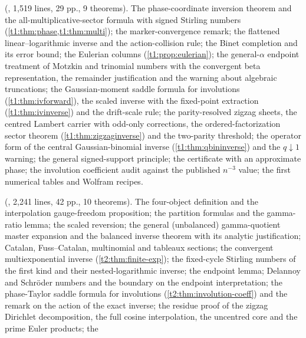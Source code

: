 \documentclass[11pt,openany]{book}
\numberwithin{equation}{chapter}
\theoremstyle{plain}
\theoremstyle{definition}
\theoremstyle{remark}
\begin{document}
\begin{description}[leftmargin=1.5em,style=nextline]
\item[Source 1 (labels \texttt{t1:}): \emph{Combinatorial Transseries and
Their Inverses: Further Families}] (,
1{,}519 lines, 29 pp., 9 theorems).  The phase-coordinate inversion theorem
and the all-multiplicative-sector formula with signed Stirling numbers
(\cref{t1:thm:phase,t1:thm:multi}); the marker-convergence remark; the
flattened linear--logarithmic inverse and the action-collision rule; the
Binet completion and its error bound; the Eulerian columns
(\cref{t1:prop:eulerian}); the general-$\alpha$ endpoint treatment of
Motzkin and trinomial numbers with the convergent beta representation, the
remainder justification and the warning about algebraic truncations; the
Gaussian-moment saddle formula for involutions (\cref{t1:thm:ivforward}),
the scaled inverse with the fixed-point extraction
(\cref{t1:thm:ivinverse}) and the drift-scale rule; the parity-resolved
zigzag sheets, the centred Lambert carrier with odd-only corrections, the
ordered-factorization sector theorem (\cref{t1:thm:zigzaginverse}) and the
two-parity threshold; the operator form of the central Gaussian-binomial
inverse (\cref{t1:thm:qbininverse}) and the $q\downarrow1$ warning; the
general signed-support principle; the certificate with an approximate
phase; the involution coefficient audit against the published $n^{-3}$
value; the first numerical tables and Wolfram recipes.
\item[Source 2 (labels \texttt{t2:}): \emph{Combinatorial Transseries and
Their Inverses}] (, 2{,}241
lines, 42 pp., 10 theorems).  The four-object definition and the
interpolation gauge-freedom proposition; the partition formulas and the
gamma-ratio lemma; the scaled reversion; the general (unbalanced)
gamma-quotient master expansion and the balanced inverse theorem with its
analytic justification; Catalan, Fuss--Catalan, multinomial and tableaux
sections; the convergent multiexponential inverse
(\cref{t2:thm:finite-exp}); the fixed-cycle Stirling numbers of the first
kind and their nested-logarithmic inverse; the endpoint lemma; Delannoy and
Schr\"oder numbers and the boundary on the endpoint interpretation; the
phase-Taylor saddle formula for involutions
(\cref{t2:thm:involution-coeff}) and the remark on the action of the exact
inverse; the residue proof of the zigzag Dirichlet decomposition, the full
cosine interpolation, the uncentred core and the prime Euler products; the

\end{description}
\end{document}
